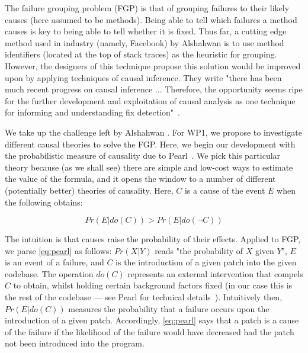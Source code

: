 
The failure grouping problem (FGP) is that of grouping failures to their likely causes (here assumed to be methods). Being able to tell which failures a method causes is key to being able to tell whether it is fixed.
 Thus far, a cutting edge method used in industry (namely, Facebook) by Alshahwan \etal is to use method identifiers (located at the top of stack traces) as the heuristic for grouping.
However, the designers of this technique propose this solution would be improved upon by applying techniques of causal inference.
They write "there has been much recent progress on causal inference \cite{Pearl} ... Therefore, the opportunity seems ripe for the further
development and exploitation of causal analysis as one technique for informing and understanding fix detection"~\cite{Facebook1}.

We take up the challenge left by Alshahwan \etal . For WP1, we propose to investigate different causal theories to solve the FGP. Here, we begin our development with 
the probabilistic measure of
causality due to Pearl~\cite{pearl2009,pearl2016causal}. We pick this particular theory because (as we shall see) there are simple and low-cost ways to estimate the value of the formula, and it opens the window to a number of different (potentially better) theories of causality.
Here, $C$ is a cause of the event $E$ when the following obtains:

\vspace*{-4.0mm}

\begin{equation}
    Pr(E | \mathit{do}(C)) > Pr(E | \mathit{do}(\neg C))
    \label{eq:pearl}
\end{equation}

The intuition is that causes raise the probability of their effects. 
Applied to FGP, we parse \autoref{eq:pearl} as follows:  $Pr(X|Y)$ reads "the
probability of $X$ given $Y$", $E$ is an event of a failure, and $C$ is the introduction of a given patch into the given
codebase. The operation $\mathit{do}(C)$ 
represents an external intervention that compels $C$ to obtain, whilst holding certain background factors fixed (in our case this is the rest of the codebase --- see Pearl for technical details~\cite{pearl2009}). Intuitively
then, $Pr(E | do(C))$ measures the probability that a
failure occurs upon the introduction of a given patch. Accordingly,
\autoref{eq:pearl} says that a
patch is a cause of the failure if the likelihood of the failure would have decreased had the patch not been introduced into the program.

